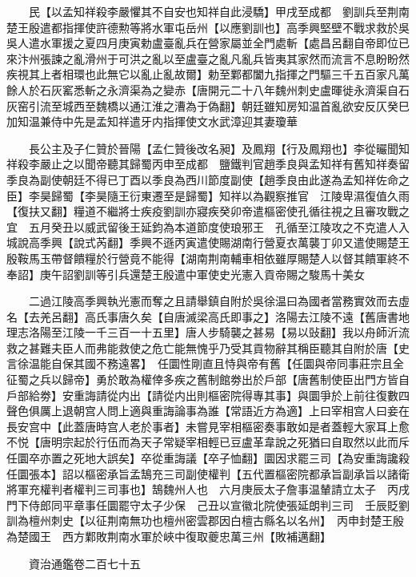 　　民【以孟知祥殺李嚴懼其不自安也知祥自此浸驕】甲戌至成都　劉訓兵至荆南楚王殷遣都指揮使許德勲等將水軍屯岳州【以應劉訓也】高季興堅壁不戰求救於吳吳人遣水軍援之夏四月庚寅勅盧臺亂兵在營家屬並全門處斬【處昌呂翻自帝即位已來汴州張諫之亂滑州于可洪之亂以至盧臺之亂凡亂兵皆夷其家然而流言不息盼盼然疾視其上者相環也此無它以亂止亂故爾】勅至鄴都闔九指揮之門驅三千五百家凡萬餘人於石灰窰悉斬之永濟渠為之變赤【唐開元二十八年魏州刺史盧暉徙永濟渠自石灰窑引流至城西至魏橋以通江淮之漕為于偽翻】朝廷雖知房知温首亂欲安反仄癸巳加知温兼侍中先是孟知祥遣牙内指揮使文水武漳迎其妻瓊華

　　長公主及子仁贊於晉陽【孟仁贊後改名昶】及鳳翔【行及鳳翔也】李從曮聞知祥殺李嚴止之以聞帝聽其歸蜀丙申至成都　鹽鐵判官趙季良與孟知祥有舊知祥奏留季良為副使朝廷不得已丁酉以季良為西川節度副使【趙季良由此遂為孟知祥佐命之臣】李昊歸蜀【李昊隨王衍東遷至是歸蜀】知祥以為觀察推官　江陵卑濕復值久雨【復扶又翻】糧道不繼將士疾疫劉訓亦寢疾癸卯帝遣樞密使孔循往視之且審攻戰之宜　五月癸丑以威武留後王延鈞為本道節度使琅邪王　孔循至江陵攻之不克遣人入城說高季興【說式芮翻】季興不遜丙寅遣使賜湖南行營夏衣萬襲丁卯又遣使賜楚王殷鞍馬玉帶督饋糧於行營竟不能得【湖南荆南輔車相依雖厚賜楚人以督其饋軍終不奉詔】庚午詔劉訓等引兵還楚王殷遣中軍使史光憲入貢帝賜之駿馬十美女

　　二過江陵高季興執光憲而奪之且請舉鎮自附於吳徐温曰為國者當務實效而去虛名【去羌呂翻】高氏事唐久矣【自唐滅梁高氏即事之】洛陽去江陵不遠【舊唐書地理志洛陽至江陵一千三百一十五里】唐人步騎襲之甚易【易以䜴翻】我以舟師沂流救之甚難夫臣人而弗能救使之危亡能無愧乎乃受其貢物辭其稱臣聽其自附於唐【史言徐温能自保其國不務遠畧】　任圜性剛直且恃與帝有舊【任圜與帝同事莊宗且全征蜀之兵以歸帝】勇於敢為權倖多疾之舊制館劵出於戶部【唐舊制使臣出門方皆自戶部給劵】安重誨請從内出【請從内出則樞密院得專其事】與圜爭於上前往復數四聲色俱厲上退朝宫人問上適與重誨論事為誰【常語近方為適】上曰宰相宫人曰妾在長安宫中【此蓋唐時宫人老於事者】未嘗見宰相樞密奏事敢如是者蓋輕大家耳上愈不悦【唐明宗起於行伍而為天子常疑宰相輕已豆盧革韋說之死猶曰自取然以此而斥任圜卒亦置之死地大誤矣】卒從重誨議【卒子恤翻】圜因求罷三司【為安重誨讒殺任圜張本】詔以樞密承旨孟鵠充三司副使權判【五代置樞密院都承旨副承旨以諸衛將軍充權判者權判三司事也】鵠魏州人也　六月庚辰太子詹事温輦請立太子　丙戌門下侍郎同平章事任圜罷守太子少保　己丑以宣徽北院使張延朗判三司　壬辰貶劉訓為檀州刺史【以征荆南無功也檀州密雲郡因白檀古縣名以名州】　丙申封楚王殷為楚國王　西方鄴敗荆南水軍於峽中復取夔忠萬三州【敗補邁翻】

　　資治通鑑卷二百七十五


    


